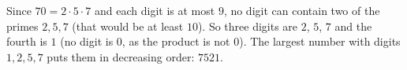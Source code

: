 Since $70=2\cdot5\cdot7$ and each digit is at most $9$, no digit can contain two of the primes $2,5,7$ (that would be at least $10$). So three digits are $2$, $5$, $7$ and the fourth is $1$ (no digit is $0$, as the product is not $0$). The largest number with digits $1,2,5,7$ puts them in decreasing order: $\boxed{7521}$.
